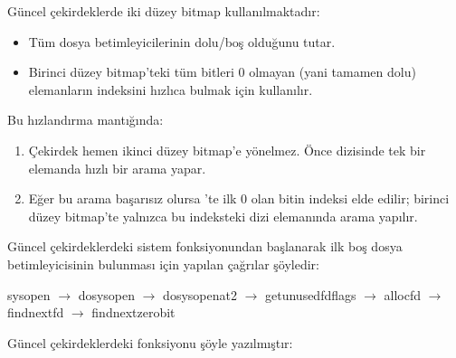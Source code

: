 \documentclass[a4paper,10pt,turkish]{sphinxmanual}
\begin{document}
\sphinxAtStartPar
Güncel çekirdeklerde iki düzey bitmap kullanılmaktadır:
\begin{itemize}
\item {} 
\sphinxAtStartPar
{} Tüm dosya betimleyicilerinin dolu/boş olduğunu tutar.

\item {} 
\sphinxAtStartPar
{} Birinci düzey bitmap’teki tüm bitleri 0 olmayan
(yani tamamen dolu)  elemanların indeksini hızlıca bulmak için kullanılır.

\end{itemize}

\sphinxAtStartPar
Bu hızlandırma mantığında:
\begin{enumerate}
%
\item {} 
\sphinxAtStartPar
Çekirdek hemen ikinci düzey bitmap’e yönelmez. Önce  dizisinde tek bir
 elemanda hızlı bir arama yapar.

\item {} 
\sphinxAtStartPar
Eğer bu arama başarısız olursa ’te ilk 0 olan bitin indeksi elde edilir;
birinci düzey bitmap’te yalnızca bu indeksteki  dizi elemanında arama yapılır.

\end{enumerate}

\sphinxAtStartPar
Güncel çekirdeklerdeki  sistem fonksiyonundan başlanarak ilk boş dosya betimleyicisinin
bulunması için yapılan çağrılar şöyledir:

\begin{sphinxVerbatim}[commandchars=\\\{\}]
sys\PYGZus{}open
  \(\rightarrow\) do\PYGZus{}sys\PYGZus{}open
    \(\rightarrow\) do\PYGZus{}sys\PYGZus{}openat2
      \(\rightarrow\) \PYGZus{}\PYGZus{}get\PYGZus{}unused\PYGZus{}fd\PYGZus{}flags
        \(\rightarrow\) alloc\PYGZus{}fd
          \(\rightarrow\) find\PYGZus{}next\PYGZus{}fd
            \(\rightarrow\) find\PYGZus{}next\PYGZus{}zero\PYGZus{}bit
\end{sphinxVerbatim}

\sphinxAtStartPar
Güncel çekirdeklerdeki  fonksiyonu şöyle yazılmıştır:
\end{document}
